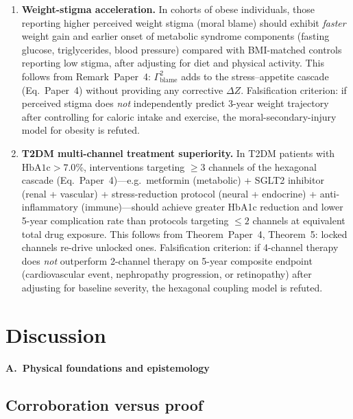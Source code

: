 \documentclass[aps,pre,twocolumn,superscriptaddress,floatfix]{revtex4-2}
\begin{document}
\begin{enumerate}
  \item \textbf{Weight-stigma acceleration.}
    In cohorts of obese individuals, those reporting
    higher perceived weight stigma (moral blame)
    should exhibit \emph{faster} weight gain and
    earlier onset of metabolic syndrome components
    (fasting glucose, triglycerides, blood pressure)
    compared with BMI-matched controls reporting
    low stigma, after adjusting for diet and
    physical activity.
    This follows from Remark~Paper~4:
    $\Gamma^2_{\text{blame}}$ adds to the
    stress--appetite cascade
    (Eq.~Paper~4) without providing
    any corrective $\Delta Z$.
    Falsification criterion: if perceived stigma
    does \emph{not} independently predict 3-year
    weight trajectory after controlling for
    caloric intake and exercise, the
    moral-secondary-injury model for obesity is
    refuted.

  \item \textbf{T2DM multi-channel treatment superiority.}
    In T2DM patients with $\mathrm{HbA1c} > 7.0$\%,
    interventions targeting $\geq 3$ channels of the
    hexagonal cascade
    (Eq.~Paper~4)---e.g.\
    metformin (metabolic) + SGLT2 inhibitor
    (renal + vascular) + stress-reduction protocol
    (neural + endocrine) + anti-inflammatory
    (immune)---should achieve greater HbA1c
    reduction and lower 5-year complication rate
    than protocols targeting $\leq 2$ channels
    at equivalent total drug exposure.
    This follows from Theorem~Paper~4, Theorem~5:
    locked channels re-drive unlocked ones.
    Falsification criterion: if 4-channel therapy
    does \emph{not} outperform 2-channel therapy
    on 5-year composite endpoint (cardiovascular
    event, nephropathy progression, or retinopathy)
    after adjusting for baseline severity,
    the hexagonal coupling model is refuted.
\end{enumerate}




\section{Discussion}
\label{sec:discussion}

\medskip\noindent\textbf{\large A.~Physical foundations and epistemology}
\medskip

\subsection{Corroboration versus proof}
\end{document}
